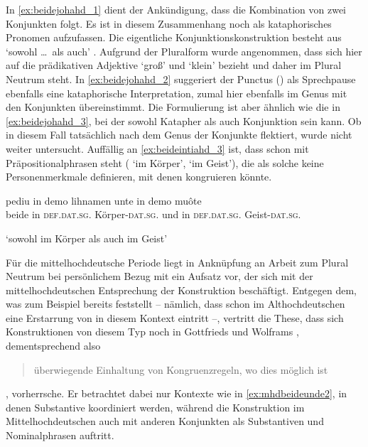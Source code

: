 In \cref{ex:beidejohahd_1} dient  der Ankündigung, dass die
Kombination von zwei Konjunkten folgt. Es ist in diesem Zusammenhang noch als
kataphorisches Pronomen aufzufassen. Die eigentliche Konjunktionskonstruktion
besteht aus  `sowohl \dots\ als auch'
\autocite[vgl.][169]{schuetzeichel2012}. Aufgrund der Pluralform wurde
angenommen, dass  sich hier auf die prädikativen Adjektive
 `groß' und 
`klein' bezieht und daher im Plural Neutrum steht. In
\cref{ex:beidejohahd_2} suggeriert der Punctus () als Sprechpause
ebenfalls eine kataphorische Interpretation, zumal  hier ebenfalls
im Genus mit den Konjunkten übereinstimmt. Die Formulierung ist aber ähnlich
wie die in \cref{ex:beidejohahd_3}, bei der  sowohl Katapher als
auch Konjunktion sein kann. Ob  in diesem Fall tatsächlich nach
dem Genus der Konjunkte flektiert, wurde nicht weiter untersucht.
Auffällig an \cref{ex:beideintiahd_3} ist, dass  schon mit
Präpositionalphrasen steht ( `im Körper',
 `im Geist'), die als solche keine Personenmerkmale
definieren, mit denen  kongruieren könnte.

\begin{exe}
\ex \label{ex:beideintiahd_3}
	\gll pediu in demo lihnamen unte in demo muôte \\
		beide in \textsc{def.dat.sg.\MascI} Körper-\textsc{dat.sg.\MascI} und in
			\textsc{def.dat.sg.\MascI} Geist-\textsc{dat.sg.\MascI} \\
	\begin{taggedline}{\parencite[APB\_PredigtsammlungB, 1732--1739]{ddd}}
	\trans `sowohl im Körper als auch im Geist'
	\end{taggedline}
\end{exe}

Für die mittelhochdeutsche Periode liegt in Anknüpfung an
 Arbeit zum Plural Neutrum bei persönlichem Bezug mit
\citet{askedal1974} ein Aufsatz vor, der sich mit der mittelhochdeutschen
Entsprechung der Konstruktion  beschäftigt. Entgegen
dem, was zum Beispiel bereits \citet[433--434]{behaghel1923} feststellt --
nämlich, dass schon im Althochdeutschen eine Erstarrung von  in
diesem Kontext eintritt --, vertritt \citeauthor{askedal1974} die These, dass
sich Konstruktionen von diesem Typ noch in Gottfrieds
\nocite{maroldschroeder1969} und Wolframs
\nocite{lachmannhartl1952} ,
dementsprechend also \blockcquote[37]{askedal1974}{überwiegende Einhaltung von
Kongruenzregeln, wo dies möglich ist}, vorherrsche. Er betrachtet dabei nur
Kontexte wie in \cref{ex:mhdbeideunde2}, in denen Substantive koordiniert
werden, während die Konstruktion im Mittelhochdeutschen auch mit anderen
Konjunkten als Substantiven und Nominalphrasen auftritt.

